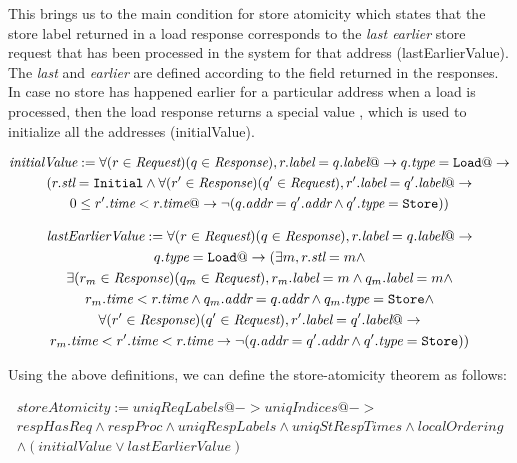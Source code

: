 This brings us to the main condition for store atomicity which states that the
store label returned in a load response corresponds to the \emph{last earlier}
store request that has been processed in the system for that address (lastEarlierValue). The
\emph{last} and \emph{earlier} are defined according to the field \mytime{}
returned in the responses. In case no store has happened earlier for a
particular address when a load is processed, then the load response returns a
special value \Initial, which is used to initialize all the addresses (initialValue).

\begin{defn}
\begin{multline*}
\textit{initialValue}:= \forall (r \in \textit{Request}) (q \in \textit{Response}), r.\textit{label} = q.\textit{label} @->
q.\textit{type} = \texttt{Load} @-> \\(r.\textit{stl} = \texttt{Initial} \wedge
\forall (r' \in \textit{Response}) (q' \in \textit{Request}),
r'.\textit{label} = q'.\textit{label} @-> \\ 0 \le r'.\textit{time} < r.\textit{time} @->
\neg (q.\textit{addr} = q'.\textit{addr} \wedge q'.\textit{type} = \texttt{Store}))
\end{multline*}
\end{defn}

\begin{defn}
\begin{multline*}
\textit{lastEarlierValue} := \forall (r \in \textit{Request}) (q \in \textit{Response}), r.\textit{label} = q.\textit{label} @-> \\
q.\textit{type} = \texttt{Load} @-> 
(\exists m, r.\textit{stl} =  m \wedge \\
\exists (r_m \in \textit{Response}) (q_m \in \textit{Request}), 
r_m.\textit{label} = m \wedge q_m.\textit{label} = m \wedge \\
r_m.\textit{time} < r.\textit{time} \wedge q_m.\textit{addr} = q.\textit{addr} \wedge q_m.\textit{type} = \texttt{Store} \wedge  \\
\forall (r' \in \textit{Response}) (q' \in \textit{Request}),
r'.\textit{label} = q'.\textit{label} @-> \\ r_m.\textit{time} < r'.\textit{time} < r.\textit{time} ->
\neg (q.\textit{addr} = q'.\textit{addr} \wedge q'.\textit{type} = \texttt{Store}))
\end{multline*}
\end{defn}

Using the above definitions, we can define the store-atomicity theorem as follows:
\begin{thm}
\begin{multline*}
storeAtomicity := \textit{uniqReqLabels} @-> \textit{uniqIndices} @-> \\
\textit{respHasReq} \wedge \textit{respProc} \wedge \textit{uniqRespLabels} \wedge
\textit{uniqStRespTimes} \wedge \textit{localOrdering}\\ \wedge 
(\textit{initialValue} \vee \textit{lastEarlierValue})
\end{multline*}
\end{thm}
